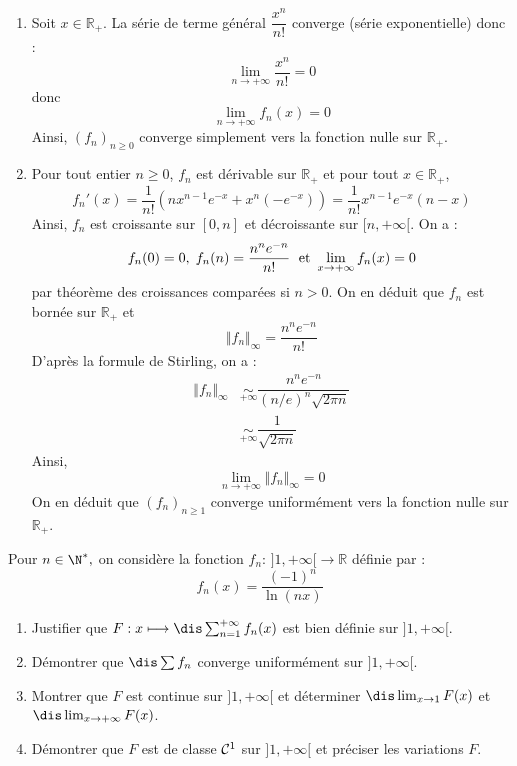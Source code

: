 \documentclass[a4paper,10pt]{report}
\begin{document}
\corr 

\begin{enumerate}
\item Soit $x \in \mathbb{R}_+$. La série de terme général $\dfrac{x^n}{n!}$ converge (série exponentielle) donc :
$$ \lim_{n \rightarrow + \infty}  \frac{x^n}{n!} = 0$$
donc 
$$ \lim_{n \rightarrow + \infty} f_n(x)=0$$
Ainsi, $(f_n)_{n \geq 0}$ converge simplement vers la fonction nulle sur $\mathbb{R}_+$.
\item Pour tout entier $n \geq 0$, $f_n$ est dérivable sur $\mathbb{R}_+$ et pour tout $x \in \mathbb{R}_+$,
$$ f_n'(x) = \dfrac{1}{n!} (nx^{n-1} e^{-x} + x^n (-e^{-x})) = \dfrac{1}{n!} x^{n-1} e^{-x} (n-x)$$
Ainsi, $f_n$ est croissante sur $[0,n]$ et décroissante sur $[n,+ \infty[$. On a :
$$ f_n(0)=0, \; f_n(n) = \dfrac{n^n e^{-n}}{n!} \; \hbox{ et } \lim_{x \rightarrow + \infty} f_n(x) = 0$$
par théorème des croissances comparées si $n>0$. On en déduit que $f_n$ est bornée sur $\mathbb{R}_+$ et 
$$ \Vert f_n \Vert_{\infty} = \dfrac{n^n e^{-n}}{n!}$$
D'après la formule de Stirling, on a :
\begin{align*}
 \Vert f_n \Vert_{\infty} & \underset{+ \infty}{\sim} \dfrac{n^n e^{-n}}{(n/e)^n \sqrt{2 \pi n}} \\
 & \underset{+ \infty}{\sim} \dfrac{1}{\sqrt{2 \pi n}} 
\end{align*}
Ainsi,
$$ \lim_{n \rightarrow + \infty} \Vert f_n \Vert_{\infty} = 0$$
On en déduit que $(f_n)_{n \geq 1}$ converge uniformément vers la fonction nulle sur $\mathbb{R}_+$.
\end{enumerate}

\begin{Exa} Pour $n\in\N^*,$ on considère la fonction $f_n : \, ] 1,+\infty[ \rightarrow \mathbb{R}$ définie par :
$$ f_n(x)=\frac{(-1)^n}{\ln(nx)}$$

\begin{enumerate}
	\item Justifier que $F : x\longmapsto \dis\sum_{n=1}^{+\infty} f_n(x)$ est bien définie sur $]1,+\infty[.$
	
	\item Démontrer que $\dis\sum f_n$ converge uniformément sur $]1,+\infty[.$ 
	
	\item Montrer que $F$ est continue sur $]1,+\infty[$ et déterminer $\dis\lim_{x \rightarrow 1}F(x)$ et  $\dis\lim_{x \rightarrow  +\infty}F(x)$.
	
	\item Démontrer que $F$ est de classe ${\cal C}^1$ sur $]1,+\infty[$ et préciser les variations $F.$
\end{enumerate}
\end{Exa}
\end{document}
